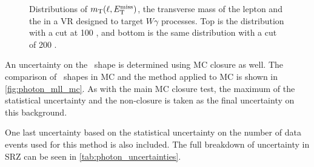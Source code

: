 \begin{centering}
\begin{figure}[!hbt]
\caption{Distributions of $m_{\text{T}}(\ell,E_{\text{T}}^{\text{miss}})$, the transverse mass of the lepton and the \met in a \ac{VR} designed to target $W\gamma$ processes. Top is the distribution with a \met cut at 100 \gev, and bottom is the same distribution with a \met cut of 200 \gev.}
\label{fig:photons_vgunc}
\end{figure}
\end{centering}

An uncertainty on the \mll~shape is determined using \ac{MC} closure as well. The comparison of \mll~shapes in \dyjets \ac{MC} and the \gjets method applied to \ac{MC} is shown in \autoref{fig:photon_mll_mc}. As with the main \ac{MC} closure test, the maximum of the statistical uncertainty and the non-closure is taken as the final uncertainty on this background.

One last uncertainty based on the statistical uncertainty on the number of \gjets data events used for this method is also included. The full breakdown of uncertainty in SRZ can be seen in \autoref{tab:photon_uncertainties}.

\begin{table}[!hbt]
\centering
{}
\caption{Uncertainty breakdown for the \gjets method in SRZ. Uncertainties considered are the impact of \ac{MC} uncertainty on $V\gamma$ backgrounds, \ac{MC} closure, uncertainty on \mll shape (also determined via \ac{MC} closure), reweighting uncertainties, smearing uncertainties, and statistical uncertainty on the \gjets events used in the method.}
\label{tab:photon_uncertainties}
\end{table}

